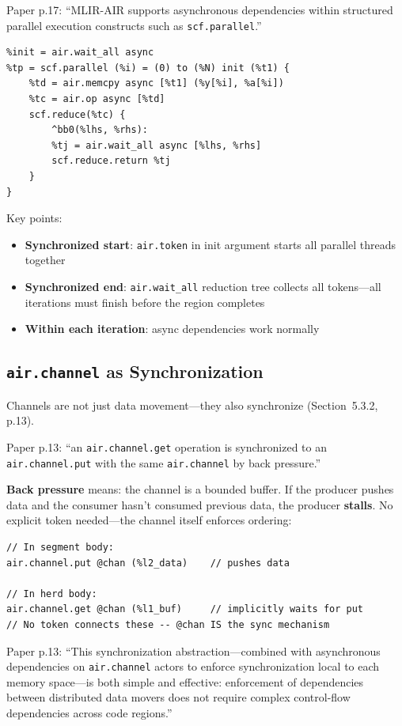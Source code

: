 \documentclass[11pt,a4paper]{article}
\begin{document}
Paper p.17: ``MLIR-AIR supports asynchronous dependencies within structured
parallel execution constructs such as \texttt{scf.parallel}.''

\begin{lstlisting}
%init = air.wait_all async
%tp = scf.parallel (%i) = (0) to (%N) init (%t1) {
    %td = air.memcpy async [%t1] (%y[%i], %a[%i])
    %tc = air.op async [%td]
    scf.reduce(%tc) {
        ^bb0(%lhs, %rhs):
        %tj = air.wait_all async [%lhs, %rhs]
        scf.reduce.return %tj
    }
}
\end{lstlisting}

Key points:
\begin{itemize}[leftmargin=2em]
  \item \textbf{Synchronized start}: \texttt{air.token} in init argument starts all
    parallel threads together
  \item \textbf{Synchronized end}: \texttt{air.wait\_all} reduction tree collects all
    tokens---all iterations must finish before the region completes
  \item \textbf{Within each iteration}: async dependencies work normally
\end{itemize}

\subsection{\texttt{air.channel} as Synchronization}

Channels are not just data movement---they also synchronize (Section~5.3.2, p.13).

Paper p.13: ``an \texttt{air.channel.get} operation is synchronized to an
\texttt{air.channel.put} with the same \texttt{air.channel} by back pressure.''

\textbf{Back pressure} means: the channel is a bounded buffer. If the producer pushes
data and the consumer hasn't consumed previous data, the producer \textbf{stalls}.
No explicit token needed---the channel itself enforces ordering:

\begin{lstlisting}
// In segment body:
air.channel.put @chan (%l2_data)    // pushes data

// In herd body:
air.channel.get @chan (%l1_buf)     // implicitly waits for put
// No token connects these -- @chan IS the sync mechanism
\end{lstlisting}

Paper p.13: ``This synchronization abstraction---combined with asynchronous
dependencies on \texttt{air.channel} actors to enforce synchronization local to each
memory space---is both simple and effective: enforcement of dependencies between
distributed data movers does not require complex control-flow dependencies across
code regions.''
\end{document}

